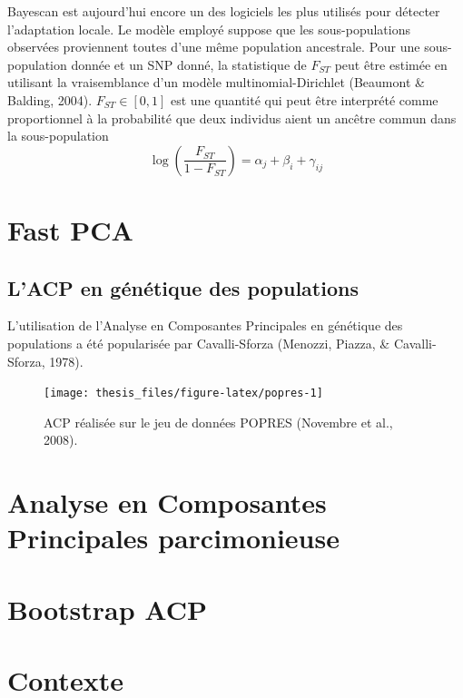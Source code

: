 \documentclass[12pt,a4paper,twoside]{ugathesis}
\theoremstyle{definition}
\theoremstyle{definition}
\theoremstyle{remark}
\begin{document}
Bayescan est aujourd'hui encore un des logiciels les plus utilisés pour
détecter l'adaptation locale. Le modèle employé suppose que les
sous-populations observées proviennent toutes d'une même population
ancestrale. Pour une sous-population donnée et un SNP donné, la
statistique de \(F_{ST}\) peut être estimée en utilisant la
vraisemblance d'un modèle multinomial-Dirichlet (Beaumont \& Balding,
2004). \(F_{ST} \in [0, 1]\) est une quantité qui peut être interprété
comme proportionnel à la probabilité que deux individus aient un ancêtre
commun dans la sous-population
\begin{equation} 
  \log \left( \frac{F_{ST}}{1 - F_{ST}} \right) = \alpha_j + \beta_i + \gamma_{ij}
  \label{eq:Bayescan-statistic}
\end{equation}
\section{Fast PCA}\label{fast-pca}

\subsection{L'ACP en génétique des
populations}\label{lacp-en-genetique-des-populations}

L'utilisation de l'Analyse en Composantes Principales en génétique des
populations a été popularisée par Cavalli-Sforza (Menozzi, Piazza, \&
Cavalli-Sforza, 1978).



\begin{figure}

{\centering \texttt{[image: thesis\_files/figure-latex/popres-1]} 

}

\caption{ACP réalisée sur le jeu de données POPRES (Novembre et
al., 2008).}\label{fig:popres}
\end{figure}
\section{Analyse en Composantes Principales
parcimonieuse}\label{analyse-en-composantes-principales-parcimonieuse}

\section{Bootstrap ACP}\label{bootstrap-acp}

\section{Contexte}\label{contexte}
\end{document}

